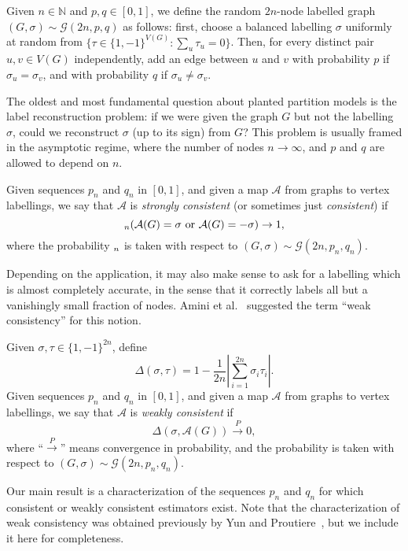 \documentclass[EJP,final]{ejpecp}
\newcommand{\N}{\mathbb{N}}
\newcommand{\1}[1]{\mathbbm{1}_{\{#1\}}}
\newcommand{\calG}{\mathcal{G}}
\newcommand{\calA}{\mathcal{A}}
\let\Pr\relax
\DeclareMathOperator{\Pr}{Pr}
\newcommand{\toP}{\stackrel{P}{\to}}
\begin{document}
\begin{definition}
Given $n \in \N$ and $p, q \in [0, 1]$, we define the random $2n$-node
labelled graph $(G, \sigma) \sim \calG(2n, p, q)$ as follows:
first, choose a balanced labelling $\sigma$ uniformly at random
from $\{\tau \in \{1, -1\}^{V(G)}: \sum_u \tau_u = 0\}$.
Then, for every distinct pair $u, v \in V(G)$ independently,
add an edge between $u$ and $v$ with probability $p$ if $\sigma_u = \sigma_v$,
and with probability $q$ if $\sigma_u \ne \sigma_v$.
\end{definition}

The oldest and most fundamental question about planted partition models
is the label reconstruction problem: if we were given the graph $G$ but not
the labelling $\sigma$, could we reconstruct $\sigma$ (up to its sign) from
$G$? This problem is usually framed in the asymptotic regime, where
the number of nodes $n \to \infty$, and $p$ and $q$ are allowed to depend
on $n$.

\begin{definition}
 Given sequences $p_n$ and $q_n$ in $[0, 1]$, and given a map $\calA$
 from graphs to vertex labellings, we say that $\calA$ is
 \emph{strongly consistent} (or sometimes just \emph{consistent}) if
 \[
   \Pr_n(\calA(G) = \sigma \text{ or } \calA(G) = -\sigma) \to 1,
 \]
 where the probability $\Pr_n$ is taken with respect to
 $(G, \sigma) \sim \calG(2n, p_n, q_n)$.
\end{definition}

Depending on the application, it may also make sense to ask for a
labelling which is almost completely accurate, in the sense that
it correctly labels all but a vanishingly small fraction of nodes.
Amini et al.~\cite{ACBL:13} suggested the term ``weak consistency'' for this notion.

\begin{definition}
 Given $\sigma, \tau \in \{1, -1\}^{2n}$, define
 \[
  \Delta(\sigma, \tau) = 1 - \frac 1{2n} \left|\sum_{i=1}^{2n} \sigma_i \tau_i\right|.
 \]
  Given sequences $p_n$ and $q_n$ in $[0, 1]$, and given a map $\calA$
 from graphs to vertex labellings, we say that $\calA$ is
 \emph{weakly consistent} if
 \[
  \Delta(\sigma, \calA(G)) \toP 0,
 \]
 where ``$\toP$'' means convergence in probability, and
 the probability is taken with respect to
 $(G, \sigma) \sim \calG(2n, p_n, q_n)$.
\end{definition}

Our main result is a characterization of the sequences $p_n$ and $q_n$
for which consistent or weakly consistent estimators exist.
Note that the characterization of weak consistency was obtained previously
by Yun and Proutiere~\cite{YunProutiere:14}, but we include it here
for completeness.
\end{document}

